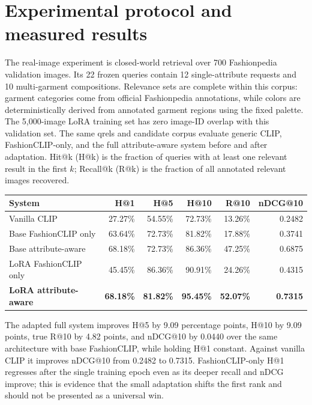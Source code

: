 \documentclass[11pt]{article}
\begin{document}
\section{Experimental protocol and measured results}

The real-image experiment is closed-world retrieval over 700 Fashionpedia validation images. Its 22 frozen queries contain 12 single-attribute requests and 10 multi-garment compositions. Relevance sets are complete within this corpus: garment categories come from official Fashionpedia annotations, while colors are deterministically derived from annotated garment regions using the fixed palette. The 5,000-image LoRA training set has zero image-ID overlap with this validation set. The same qrels and candidate corpus evaluate generic CLIP, FashionCLIP-only, and the full attribute-aware system before and after adaptation. Hit@k (H@k) is the fraction of queries with at least one relevant result in the first $k$; Recall@k (R@k) is the fraction of all annotated relevant images recovered.

\begin{center}
\small
\begin{tabular}{@{}lrrrrr@{}}
\toprule
\textbf{System} & \textbf{H@1} & \textbf{H@5} & \textbf{H@10} & \textbf{R@10} & \textbf{nDCG@10} \\
\midrule
Vanilla CLIP & 27.27\% & 54.55\% & 72.73\% & 13.26\% & 0.2482 \\
Base FashionCLIP only & 63.64\% & 72.73\% & 81.82\% & 17.88\% & 0.3741 \\
Base attribute-aware & 68.18\% & 72.73\% & 86.36\% & 47.25\% & 0.6875 \\
LoRA FashionCLIP only & 45.45\% & 86.36\% & 90.91\% & 24.26\% & 0.4315 \\
\textbf{LoRA attribute-aware} & \textbf{68.18\%} & \textbf{81.82\%} & \textbf{95.45\%} & \textbf{52.07\%} & \textbf{0.7315} \\
\bottomrule
\end{tabular}
\end{center}

The adapted full system improves H@5 by 9.09 percentage points, H@10 by 9.09 points, true R@10 by 4.82 points, and nDCG@10 by 0.0440 over the same architecture with base FashionCLIP, while holding H@1 constant. Against vanilla CLIP it improves nDCG@10 from 0.2482 to 0.7315. FashionCLIP-only H@1 regresses after the single training epoch even as its deeper recall and nDCG improve; this is evidence that the small adaptation shifts the first rank and should not be presented as a universal win.
\end{document}
